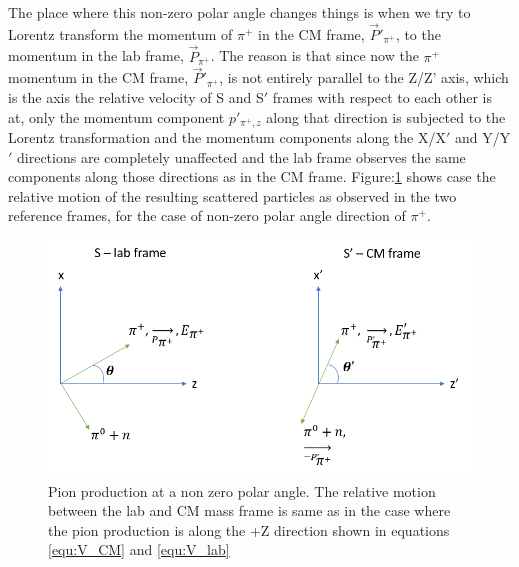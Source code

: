 \documentclass[11pt,letterpaper]{article}
\begin{document}
The place where this non-zero polar angle changes things is when we try to Lorentz transform the  momentum of $\pi^+$ in the CM frame, $\vec{P}'_{\pi^+}$, to the momentum in the lab frame, $\vec{P}_{\pi^+}$. The reason is that since now the $\pi^+$ momentum in the CM frame, $\vec{P}'_{\pi^+}$, is not entirely parallel to the Z/Z' axis, which is the axis the relative velocity of S and S$'$ frames with respect to each other is at, only the momentum component  $p'_{\pi^+,z}$ along that direction is subjected to the Lorentz transformation and the momentum components along the X/X$'$ and Y/Y$'$ directions are completely unaffected and the lab frame observes the same components along those directions as in the CM frame. Figure:\ref{fig:pion production at a polar angle} shows case the relative motion of the resulting scattered particles as observed in the two reference frames, for the case of non-zero polar angle direction of $\pi^+$.

\begin{figure}
    \centering
    \includegraphics[scale=0.75]{Images/lab and CM ref frames for polar angle pion prod.png}
    \caption{Pion production at a non zero polar angle. The relative motion between the lab and CM mass frame is same as in the case where the pion production is along the +Z direction shown in equations \ref{equ:V_CM} and \ref{equ:V_lab}}
    \label{fig:pion production at a polar angle}
\end{figure}
\end{document}
